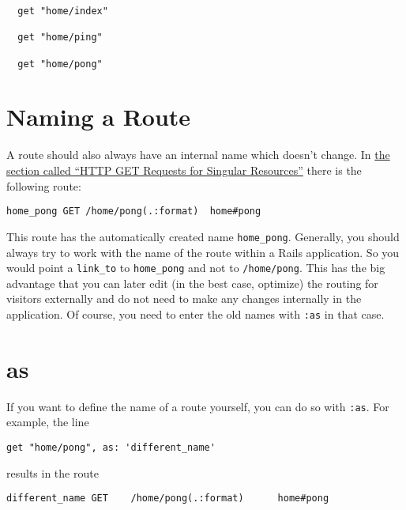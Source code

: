 \documentclass[a4paper]{book}
\begin{document}
\begin{shaded}\begin{verbatim}
  get "home/index"

  get "home/ping"

  get "home/pong"
\end{verbatim}\end{shaded}

\section{Naming a Route}\label{naming-a-route}

A route should also always have an internal name which doesn't change. In \hyperref[routesux5fget]{the section called “HTTP GET Requests for Singular Resources”} there is the following route:

\begin{shaded}\begin{verbatim}
home_pong GET /home/pong(.:format)  home#pong
\end{verbatim}\end{shaded}

This route has the automatically created name \texttt{home\_pong}. Generally, you should always try to work with the name of the route within a Rails application. So you would point a \texttt{link\_to} to \texttt{home\_pong} and not to \texttt{/home/pong}. This has the big advantage that you can later edit (in the best case, optimize) the routing for visitors externally and do not need to make any changes internally in the application. Of course, you need to enter the old names with \texttt{:as} in that case.

\section{as}\label{as}

If you want to define the name of a route yourself, you can do so with \texttt{:as}. For example, the line

\begin{shaded}\begin{verbatim}
get "home/pong", as: 'different_name'
\end{verbatim}\end{shaded}

results in the route

\begin{shaded}\begin{verbatim}
different_name GET    /home/pong(.:format)      home#pong
\end{verbatim}\end{shaded}
\end{document}
